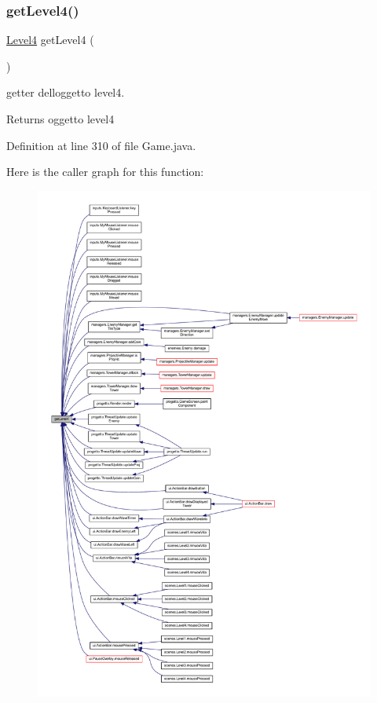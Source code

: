 \subsubsection{\texorpdfstring{get\+Level4()}{getLevel4()}}
{\footnotesize\ttfamily \hyperlink{classscenes_1_1_level4}{Level4} get\+Level4 (\begin{DoxyParamCaption}{ }\end{DoxyParamCaption})}



getter dell\textquotesingle{}oggetto level4. 

\begin{DoxyReturn}{Returns}
oggetto level4 
\end{DoxyReturn}


Definition at line 310 of file Game.\+java.

Here is the caller graph for this function\+:
\nopagebreak
\begin{figure}[H]
\begin{center}
\leavevmode
\includegraphics[width=350pt]{classprogetto_1_1_game_a09e02ae6992f3328be34c9062ef142f8_icgraph}
\end{center}
\end{figure}
\mbox{\label{classprogetto_1_1_game_a32527bf330947f1c1d1f5a7da9d12940}} 
